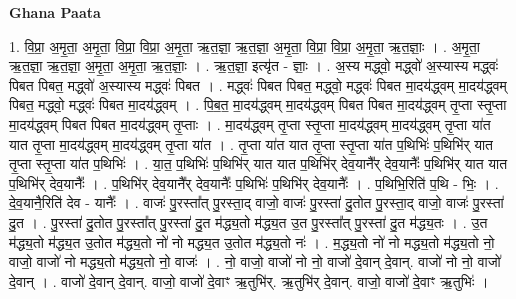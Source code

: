 \documentclass[17pt]{extarticle}
\begin{document}
\textbf{Ghana Paata } \newline

1. वि॒प्रा॒ अ॒मृ॒ता॒ अ॒मृ॒ता॒ वि॒प्रा॒ वि॒प्रा॒ अ॒मृ॒ता॒ ऋ॒त॒ज्ञा॒ ऋ॒त॒ज्ञा॒ अ॒मृ॒ता॒ वि॒प्रा॒ वि॒प्रा॒ अ॒मृ॒ता॒ ऋ॒त॒ज्ञाः॒ । . अ॒मृ॒ता॒ ऋ॒त॒ज्ञा॒ ऋ॒त॒ज्ञा॒ अ॒मृ॒ता॒ अ॒मृ॒ता॒ ऋ॒त॒ज्ञाः॒ । . ऋ॒त॒ज्ञा॒ इत्यृ॑त - ज्ञाः॒ । . अ॒स्य मद्ध्वो॒ मद्ध्वो॑ अ॒स्यास्य मद्ध्वः॑ पिबत पिबत॒ मद्ध्वो॑ अ॒स्यास्य मद्ध्वः॑ पिबत । . मद्ध्वः॑ पिबत पिबत॒ मद्ध्वो॒ मद्ध्वः॑ पिबत मा॒दय॑द्ध्वम् मा॒दय॑द्ध्वम् पिबत॒ मद्ध्वो॒ मद्ध्वः॑ पिबत मा॒दय॑द्ध्वम् । . पि॒ब॒त॒ मा॒दय॑द्ध्वम् मा॒दय॑द्ध्वम् पिबत पिबत मा॒दय॑द्ध्वम् तृ॒प्ता स्तृ॒प्ता मा॒दय॑द्ध्वम् पिबत पिबत मा॒दय॑द्ध्वम् तृ॒प्ताः । . मा॒दय॑द्ध्वम् तृ॒प्ता स्तृ॒प्ता मा॒दय॑द्ध्वम् मा॒दय॑द्ध्वम् तृ॒प्ता या॑त यात तृ॒प्ता मा॒दय॑द्ध्वम् मा॒दय॑द्ध्वम् तृ॒प्ता या॑त । . तृ॒प्ता या॑त यात तृ॒प्ता स्तृ॒प्ता या॑त प॒थिभिः॑ प॒थिभि॑र् यात तृ॒प्ता स्तृ॒प्ता या॑त प॒थिभिः॑ । . या॒त॒ प॒थिभिः॑ प॒थिभि॑र् यात यात प॒थिभि॑र् देव॒यानै᳚र् देव॒यानैः᳚ प॒थिभि॑र् यात यात प॒थिभि॑र् देव॒यानैः᳚ । . प॒थिभि॑र् देव॒यानै᳚र् देव॒यानैः᳚ प॒थिभिः॑ प॒थिभि॑र् देव॒यानैः᳚ । . प॒थिभि॒रिति॑ प॒थि - भिः॒ । . दे॒व॒यानै॒रिति॑ देव - यानैः᳚ । . वाजः॑ पु॒रस्ता᳚त् पु॒रस्ता॒द् वाजो॒ वाजः॑ पु॒रस्ता॑ दु॒तोत पु॒रस्ता॒द् वाजो॒ वाजः॑ पु॒रस्ता॑ दु॒त । . पु॒रस्ता॑ दु॒तोत पु॒रस्ता᳚त् पु॒रस्ता॑ दु॒त म॑द्ध्य॒तो म॑द्ध्य॒त उ॒त पु॒रस्ता᳚त् पु॒रस्ता॑ दु॒त म॑द्ध्य॒तः । . उ॒त म॑द्ध्य॒तो म॑द्ध्य॒त उ॒तोत म॑द्ध्य॒तो नो॑ नो मद्ध्य॒त उ॒तोत म॑द्ध्य॒तो नः॑ । . म॒द्ध्य॒तो नो॑ नो मद्ध्य॒तो म॑द्ध्य॒तो नो॒ वाजो॒ वाजो॑ नो मद्ध्य॒तो म॑द्ध्य॒तो नो॒ वाजः॑ । . नो॒ वाजो॒ वाजो॑ नो नो॒ वाजो॑ दे॒वान् दे॒वान्. वाजो॑ नो नो॒ वाजो॑ दे॒वान् । . वाजो॑ दे॒वान् दे॒वान्. वाजो॒ वाजो॑ दे॒वाꣳ ऋ॒तुभि॑र्. ऋ॒तुभि॑र् दे॒वान्. वाजो॒ वाजो॑ दे॒वाꣳ ऋ॒तुभिः॑ । \newline
\end{document}
